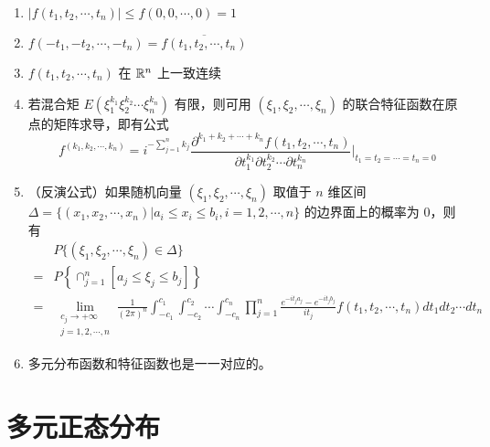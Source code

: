 \documentclass[12pt,a4paper]{amsart}
\begin{document}
\begin{proposition}[多元特征函数的性质]
    \begin{enumerate}
        \item $|f(t_1, t_2, \cdots, t_n)| \leq f(0, 0, \cdots, 0) = 1$
        \item $f(-t_1, -t_2, \cdots, -t_n) = \overline{f(t_1, t_2, \cdots, t_n)}$
        \item $f(t_1, t_2, \cdots, t_n)$ 在 $\mathbb{R}^n$ 上一致连续
        \item 若混合矩 $E(\xi_1^{k_1}\xi_2^{k_2}\cdots\xi_n^{k_n})$ 有限，则可用 $(\xi_1, \xi_2, \cdots, \xi_n)$ 的联合特征函数在原点的矩阵求导，即有公式
        \begin{equation}
            f^{(k_1, k_2, \cdots, k_n)} = i^{-\sum_{j=1}^{n} k_j} \frac{\partial^{k_1+k_2+\cdots+k_n} f(t_1, t_2, \cdots, t_n)}{\partial t_1^{k_1} \partial t_2^{k_2} \cdots \partial t_n^{k_n}} \Bigg|_{t_1=t_2=\cdots=t_n=0}
        \end{equation}
        \item （反演公式）如果随机向量 $(\xi_1, \xi_2, \cdots, \xi_n)$ 取值于 $n$ 维区间 $\Delta = \{(x_1, x_2, \cdots, x_n) | a_i \leq x_i \leq b_i, i=1, 2, \cdots, n\}$ 的边界面上的概率为 0，则有
        \begin{equation}
            \begin{aligned}
                &P\{(\xi_1, \xi_2, \cdots, \xi_n)\in\Delta\} \\
                =&P\left\{\cap_{j=1}^{n} [a_j \leq \xi_j \leq b_j] \right\} \\
                =&\lim\limits_{\substack{c_j\to+\infty \\ j = 1,2,\cdots,n}} \frac{1}{(2\pi)^n} \int_{-c_1}^{c_1} \int_{-c_2}^{c_2} \cdots \int_{-c_n}^{c_n} \prod_{j=1}^{n} \frac{e^{-it_ja_j}-e^{-it_jb_j}}{it_j} f(t_1, t_2, \cdots, t_n) dt_1 dt_2 \cdots dt_n
            \end{aligned}
        \end{equation}
        \item 多元分布函数和特征函数也是一一对应的。
    \end{enumerate}
\end{proposition}

\section{多元正态分布}
\end{document}
